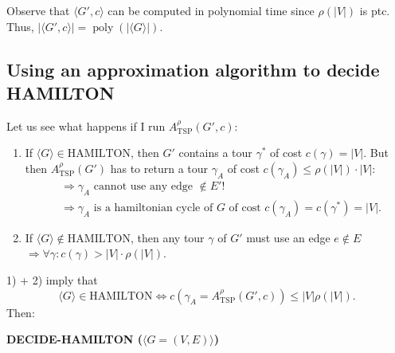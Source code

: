 Observe that $\langle G',c\rangle$ can be computed in polynomial time since $\rho(|V|)$ is ptc. Thus, $|\langle G',c\rangle|=\operatorname{poly}(|\langle G\rangle|)$.

\subsection{Using an approximation algorithm to decide HAMILTON}
Let us see what happens if I run $A_{\mathrm{TSP}}^\rho(G',c)$:
\begin{enumerate}
\item If $\langle G\rangle\in\mathrm{HAMILTON}$, then $G'$ contains a tour $\gamma^*$ of cost $c(\gamma)=|V|$. But then $A_{\mathrm{TSP}}^\rho(G')$ has to return a tour $\gamma_A$ of cost $c(\gamma_A)\leq\rho(|V|)\cdot|V|$:
\begin{align*}
&\Rightarrow\gamma_A\text{ cannot use any edge }\notin E'!\\
&\Rightarrow\gamma_A\text{ is a hamiltonian cycle of $G$ of cost }c(\gamma_A)=c(\gamma^*)=|V|.
\end{align*}
\item If $\langle G\rangle\notin\mathrm{HAMILTON}$, then any tour $\gamma$ of $G'$ must use an edge $e\notin E$ $\Rightarrow\forall\gamma:c(\gamma)>|V|\cdot\rho(|V|)$.
\end{enumerate}
1) + 2) imply that
\[\langle G\rangle\in\mathrm{HAMILTON}\Longleftrightarrow c(\gamma_A=A_{\mathrm{TSP}}^\rho(G',c))\leq|V|\rho(|V|).\]
Then:
\begin{notesalgorithm}
\textbf{DECIDE-HAMILTON ($\langle G=(V,E)\rangle$)}
\begin{notespseudocode}
\end{notespseudocode}
\end{notesalgorithm}
